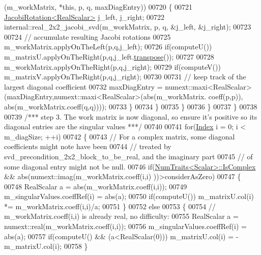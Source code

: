 \begin{DoxyCode}
      (m\_workMatrix, *\textcolor{keyword}{this}, p, q, maxDiagEntry))
00720           \{
00721             \hyperlink{group___jacobi___module_class_eigen_1_1_jacobi_rotation}{JacobiRotation<RealScalar>} j\_left, j\_right;
00722             internal::real\_2x2\_jacobi\_svd(m\_workMatrix, p, q, &j\_left, &j\_right);
00723 
00724             \textcolor{comment}{// accumulate resulting Jacobi rotations}
00725             m\_workMatrix.applyOnTheLeft(p,q,j\_left);
00726             \textcolor{keywordflow}{if}(computeU()) m\_matrixU.applyOnTheRight(p,q,j\_left.\hyperlink{group___jacobi___module_ab40e9cdc4582593511e57ee896e055a2}{transpose}());
00727 
00728             m\_workMatrix.applyOnTheRight(p,q,j\_right);
00729             \textcolor{keywordflow}{if}(computeV()) m\_matrixV.applyOnTheRight(p,q,j\_right);
00730 
00731             \textcolor{comment}{// keep track of the largest diagonal coefficient}
00732             maxDiagEntry = numext::maxi<RealScalar>(maxDiagEntry,numext::maxi<RealScalar>(abs(m\_workMatrix.
      coeff(p,p)), abs(m\_workMatrix.coeff(q,q))));
00733           \}
00734         \}
00735       \}
00736     \}
00737   \}
00738 
00739   \textcolor{comment}{/*** step 3. The work matrix is now diagonal, so ensure it's positive so its diagonal entries are the
       singular values ***/}
00740 
00741   \textcolor{keywordflow}{for}(\hyperlink{group___s_v_d___module_a6229a37997eca1072b52cca5ee7a2bec}{Index} i = 0; i < m\_diagSize; ++i)
00742   \{
00743     \textcolor{comment}{// For a complex matrix, some diagonal coefficients might note have been}
00744     \textcolor{comment}{// treated by svd\_precondition\_2x2\_block\_to\_be\_real, and the imaginary part}
00745     \textcolor{comment}{// of some diagonal entry might not be null.}
00746     \textcolor{keywordflow}{if}(\hyperlink{group___core___module_struct_eigen_1_1_num_traits}{NumTraits<Scalar>::IsComplex} && abs(numext::imag(m\_workMatrix.coeff(i,i)
      ))>considerAsZero)
00747     \{
00748       RealScalar a = abs(m\_workMatrix.coeff(i,i));
00749       m\_singularValues.coeffRef(i) = abs(a);
00750       \textcolor{keywordflow}{if}(computeU()) m\_matrixU.col(i) *= m\_workMatrix.coeff(i,i)/a;
00751     \}
00752     \textcolor{keywordflow}{else}
00753     \{
00754       \textcolor{comment}{// m\_workMatrix.coeff(i,i) is already real, no difficulty:}
00755       RealScalar a = numext::real(m\_workMatrix.coeff(i,i));
00756       m\_singularValues.coeffRef(i) = abs(a);
00757       \textcolor{keywordflow}{if}(computeU() && (a<RealScalar(0))) m\_matrixU.col(i) = -m\_matrixU.col(i);
00758     \}

\end{DoxyCode}
